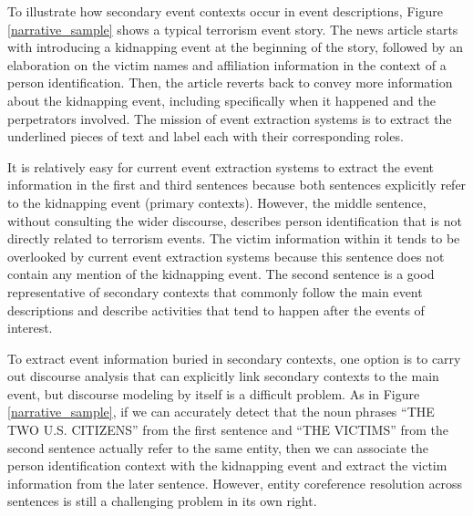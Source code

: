  
 To illustrate how secondary event contexts occur in event 
 descriptions, Figure \ref{narrative_sample} shows a typical terrorism 
 event story. The news article starts with introducing a kidnapping event 
 at the beginning of the story, followed by an elaboration on the 
 victim names and affiliation information in the context of a person identification.  
 Then, the article reverts back to convey more information about the kidnapping event,
  including specifically when it happened and the perpetrators involved. 
 The mission of event extraction systems is to extract 
 the underlined 
 pieces of text and label each with their corresponding roles. 
 
 It is relatively easy for current event extraction systems to 
 extract the event information in the first and third sentences because 
 both sentences explicitly refer to the kidnapping event (primary contexts).
 However, the middle sentence, without consulting the wider discourse, 
 describes person identification that is not directly related to 
 terrorism events. The victim information within it
  tends to be overlooked by current event extraction systems 
  because this sentence does not contain any mention 
 of the kidnapping event.
 The second sentence is a good representative of secondary contexts 
 that commonly follow the main event descriptions  
 and describe 
 activities that tend to happen after the events of interest.
  
 To extract event information buried in secondary contexts, one option 
 is to carry out discourse analysis that can explicitly link 
 secondary contexts to the main event, but discourse modeling by itself 
 is a difficult problem. 
 As in Figure \ref{narrative_sample}, if we can accurately detect that 
 the noun phrases ``THE TWO U.S. CITIZENS'' from the first sentence and 
 ``THE VICTIMS'' from the second sentence actually refer to the same entity, 
 then we can associate the person identification context with 
 the kidnapping event and extract the victim information 
 from the later sentence. However, entity coreference resolution 
 across sentences is still a challenging problem in its own right. 

